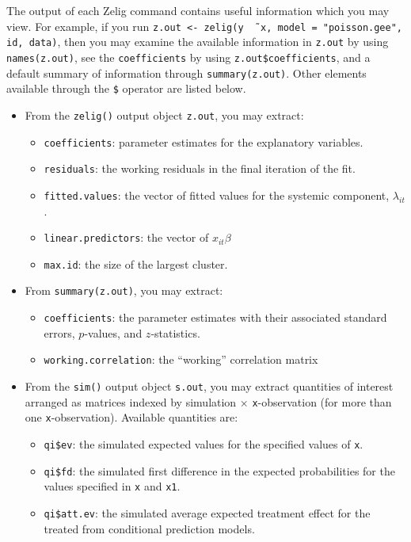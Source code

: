 The output of each Zelig command contains useful information which you
may view.  For example, if you run \texttt{z.out <- zelig(y \~\, x,
  model = "poisson.gee", id, data)}, then you may examine the available
information in \texttt{z.out} by using \texttt{names(z.out)},
see the {\tt coefficients} by using {\tt z.out\$coefficients}, and
a default summary of information through \texttt{summary(z.out)}.
Other elements available through the {\tt \$} operator are listed
below.

\begin{itemize}
\item From the {\tt zelig()} output object {\tt z.out}, you may
  extract:
   \begin{itemize}
   \item {\tt coefficients}: parameter estimates for the explanatory
     variables.
   \item {\tt residuals}: the working residuals in the final iteration
     of the fit.
   \item {\tt fitted.values}: the vector of fitted values for the
     systemic component, $\lambda_{it}$.
   \item {\tt linear.predictors}: the vector of $x_{it}\beta$
   \item {\tt max.id}: the size of the largest cluster.
   \end{itemize}

\item From {\tt summary(z.out)}, you may extract:
   \begin{itemize}
   \item {\tt coefficients}: the parameter estimates with their
     associated standard errors, $p$-values, and $z$-statistics.
   \item {\tt working.correlation}: the ``working'' correlation matrix
   \end{itemize}

\item From the {\tt sim()} output object {\tt s.out}, you may extract
  quantities of interest arranged as matrices indexed by simulation
  $\times$ {\tt x}-observation (for more than one {\tt x}-observation).
  Available quantities are:

   \begin{itemize}
   \item {\tt qi\$ev}: the simulated expected values for the
     specified values of {\tt x}.
   \item {\tt qi\$fd}: the simulated first difference in the expected
     probabilities for the values specified in {\tt x} and {\tt x1}.
   \item {\tt qi\$att.ev}: the simulated average expected treatment
     effect for the treated from conditional prediction models.
   \end{itemize}
\end{itemize}

